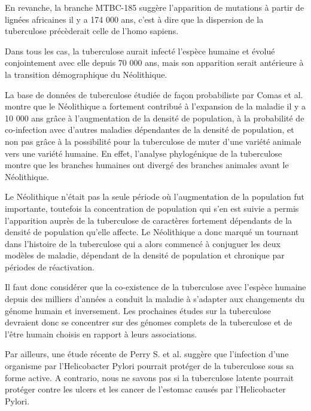\documentclass[twoside,a4paper,11pt,frenchb,openany]{report}
\begin{document}
En revanche, la branche MTBC-185 suggère l'apparition de mutations à partir de lignées africaines il y a 174 000 ans, c'est à dire que la dispersion de la tuberculose précèderait celle de l'homo sapiens.


Dans tous les cas, la tuberculose aurait infecté l'espèce humaine et évolué conjointement avec elle depuis 70 000 ans, mais son apparition serait antérieure à la transition démographique du Néolithique.

La base de données de tuberculose étudiée de façon probabiliste par Comas et al. montre que le Néolithique a fortement contribué à l'expansion de la maladie il y a 10 000 ans grâce à l'augmentation de la densité de population, à la probabilité de co-infection avec d'autres maladies dépendantes de la densité de population, et non pas grâce à la possibilité pour la tuberculose de muter d'une variété animale vers une variété humaine. En effet, l'analyse phylogénique de la tuberculose montre que les branches humaines ont divergé des branches animales avant le Néolithique.

Le Néolithique n'était pas la seule période où l'augmentation de la population fut importante, toutefois la concentration de population qui s'en est suivie a permis l'apparition auprès de la tuberculose de caractères fortement dépendants de la densité de population qu'elle affecte. Le Néolithique a donc marqué un tournant dans l'histoire de la tuberculose qui a alors commencé à conjuguer les deux modèles de maladie, dépendant de la densité de population et chronique par périodes de réactivation.


Il faut donc considérer que la co-existence de la tuberculose avec l'espèce humaine depuis des milliers d'années a conduit la maladie à s'adapter aux changements du génome humain et inversement. Les prochaines études sur la tuberculose devraient donc se concentrer sur des génomes complets de la tuberculose et de l'être humain choisis en rapport à leurs associations.

Par ailleurs, une étude récente de Perry S. et al.\cite{perry1, perry2} suggère que l'infection d'une organisme par l'Helicobacter Pylori pourrait protéger de la tuberculose sous sa forme active. A contrario, nous ne savons pas si la tuberculose latente pourrait protéger contre les ulcers et les cancer de l'estomac causés par l'Helicobacter Pylori.
\end{document}
